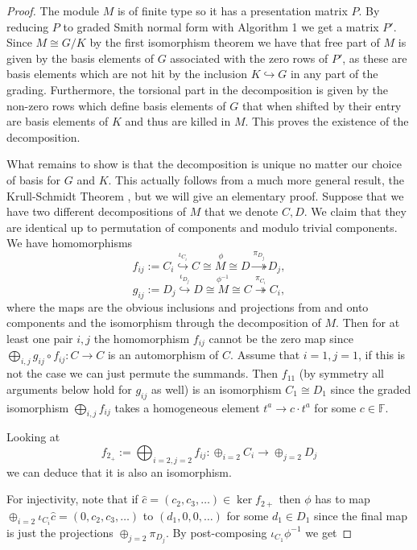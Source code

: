 \begin{proof}
  The module $M$ is of finite type so it has a presentation matrix $P$. By reducing $P$ to graded Smith normal form with Algorithm 1 we get a matrix $P'$. Since $M \cong G/K$ by the first isomorphism theorem we have that free part of $M$ is given by the basis elements of $G$ associated with the zero rows of $P'$, as these are basis elements which are not hit by the inclusion $K \hookrightarrow G$ in any part of the grading. Furthermore, the torsional part in the decomposition is given by the non-zero rows which define basis elements of $G$ that when shifted by their entry are basis elements of $K$ and thus are killed in $M$. This proves the existence of the decomposition.

  What remains to show is that the decomposition is unique no matter our choice of basis for $G$ and $K$. This actually follows from a much more general result, the Krull-Schmidt Theorem \cite[p. ~115]{jacobson2009basic}, but we will give an elementary proof. Suppose that we have two different decompositions of $M$ that we denote $C,D$. We claim that they are identical up to permutation of components and modulo trivial components. We have homomorphisms
  \[
    f_{ij} := C_{i} \overset{\iota_{C_{i}}}{\hookrightarrow} \overset{\phi}{C \cong M  \cong D}  \overset{\pi_{D_{j}}}{\twoheadrightarrow} D_{j},
  \]
\[
  g_{ij} := D_{j} \overset{\iota_{D_{j}}}{\hookrightarrow} \overset{\phi^{-1}}{D \cong M  \cong C}  \overset{\pi_{C_{i}}}{\twoheadrightarrow} C_{i},
  \]
  where the maps are the obvious inclusions and projections from and onto components and the isomorphism through the decomposition of $M$. Then for at least one pair $i,j$ the homomorphism $f_{ij}$ cannot be the zero map since $\bigoplus_{i,j} g_{ij} \circ f_{ij}: C \to C$ is an automorphism of $C$. Assume that $i=1,j=1$, if this is not the case we can just permute the summands.  Then $f_{11}$ (by symmetry all arguments below hold for $g_{ij}$ as well) is an isomorphism $C_{1} \cong D_{1}$ since the graded isomorphism $\bigoplus_{i,j} f_{ij}$ takes a homogeneous element $t^{a} \to c \cdot t^{a}$ for some $c \in \mathbb{F}$.

  Looking at \[f_{2_{+}}:= \bigoplus_{i=2,j=2} f_{ij}: \oplus_{i=2}C_{i} \to \oplus_{j=2} D_{j}\] we can deduce that it is also an isomorphism.

  For injectivity, note that if $\hat c = (c_{2},c_{3},\dots) \in \ker f_{2+}$ then $\phi$ has to map $\oplus_{i=2} \iota_{C_{i}} \hat c=(0,c_{2},c_{3},\dots)$ to $(d_{1},0,0,\dots)$ for some $d_{1} \in D_{1}$ since the final map is just the projections $\oplus_{j=2}\pi_{D_{j}}$. By post-composing $\iota_{C_{1}} \phi^{-1}$ we get


\end{proof}
